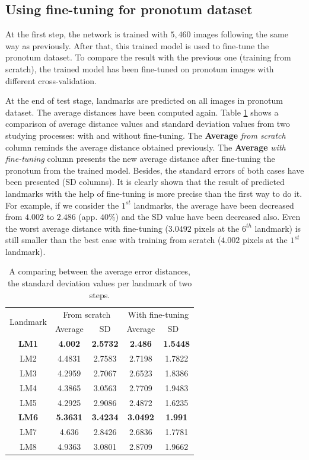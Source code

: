 \documentclass{article} %
\begin{document}
\begin{multicols}{2}
\subsection{Using fine-tuning for pronotum dataset}
At the first step, the network is trained with $5,460$ images following
the same way as previously. After that, 
this trained model is used to fine-tune the pronotum dataset. To compare the result with the previous one (training from scratch), the trained model has been fine-tuned on pronotum images with different cross-validation. 

At the end of test stage, landmarks are predicted on all images in pronotum dataset. The average distances have been computed again. Table \ref{table3} shows a comparison of average distance values and standard deviation values from two studying processes: with and without fine-tuning. The \textbf{Average} \textit{from scratch} column reminds
the average distance obtained previously. The \textbf{Average} \textit{with fine-tuning}
column presents the new average distance
after fine-tuning the pronotum from the trained model. Besides, the standard errors of both cases have been presented (SD columns). It is
clearly shown that the result of predicted landmarks with the help of
fine-tuning is more precise than the first way to do it. For example, if we consider the $1^{st}$ landmarks, the average have been decreased from \textbf{$4.002$} to \textbf{$2.486$} (app. $40\%$) and the SD value have been decreased also. Even the worst average distance with fine-tuning ($3.0492$ pixels at the $6^{th}$ landmark) is still smaller than the best case with training from scratch ($4.002$ pixels at the $1^{st}$ landmark).

\begin{table}[H]
\centering
\begin{tabular}{ | c | c | c | c | c | }
\hline
	\multicolumn{1}{|c|}{\multirow{2}{*}{Landmark}} & \multicolumn{2}{c|}{From scratch} &  \multicolumn{2}{c|}{With fine-tuning}  \\ \cline{2-5}
	 & Average & SD & Average & SD \  \\ \hline
	\textbf{LM1} & \textbf{4.002} & \textbf{2.5732} & \textbf{2.486} & \textbf{1.5448} \\ \hline
	LM2 & 4.4831 & 2.7583 & 2.7198 & 1.7822 \\ \hline
	LM3 & 4.2959 & 2.7067 & 2.6523 & 1.8386 \\ \hline
	LM4 & 4.3865 & 3.0563 & 2.7709 & 1.9483 \\ \hline
	LM5 & 4.2925 & 2.9086 & 2.4872 & 1.6235 \\ \hline
	\textbf{LM6} & \textbf{5.3631} & \textbf{3.4234} & \textbf{3.0492} & \textbf{1.991} \\ \hline
	LM7 & 4.636 & 2.8426 & 2.6836 & 1.7781 \\ \hline
	LM8 & 4.9363 & 3.0801 & 2.8709 & 1.9662 \\ \hline
\end{tabular}
\caption{\footnotesize{A comparing between the average error distances, the standard deviation values per landmark of two steps.}}
\label{table3}
\end{table}


\end{multicols}
\end{document}
